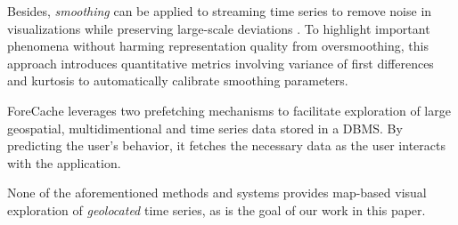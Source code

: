 Besides, {\em smoothing} can be applied to streaming time series to remove noise in visualizations while preserving large-scale deviations \cite{rong2017vldb}. To highlight important phenomena without harming representation quality from oversmoothing, this approach introduces quantitative metrics involving variance of first differences and kurtosis to automatically calibrate smoothing parameters.

ForeCache \cite{battle2016sigmod} leverages two prefetching mechanisms to facilitate exploration of large geospatial, multidimentional and time series data stored in a DBMS. By predicting the user's behavior, it fetches the necessary data as the user interacts with the application.

None of the aforementioned methods and systems provides map-based visual exploration of {\em geolocated} time series, as is the goal of our work in this paper.
\vspace{-7pt}

\begin{comment}
\snote{{\bf CHECK:} The following are not related to time series.}

IncVisage \cite{rahman2017vldb} is an incremental visualization tool for obtaining trendlines and heatmaps over large datasets. Trading error against latency, it employs online sampling schemes in order to quickly provide a visualization encompassing salient features with error guarantees. Afterwards, at an extra overhead, this initial approximation can get incrementally improved and finally even become exact over the entire data.

ZQL is a visual exploration algebra and query language introduced in \cite{siddiqui2016vldb}, which is able to express visual patterns through an interactive GUI. When searching for such patterns (e.g., representatives or outliers) in large data collections, a graph-based query optimizer operates as a wrapper over any relational DBMS used as a backend repository.

FlashView \cite{pang2017vldb} is a visual data explorer that can directly query raw data files and estimate a series of aggregates in real-time. Those correlated estimates can be depicted into charts through a user interface.

Foresight \cite{demiralp2017vldb} is a platform that facilitates discovery of visual insights (e.g., dispersion, skewness, outliers, linear correlation) from large high-dimensional datasets. Instead of directly exploring data dimensions and visual encodings, this approach handles those insights as first-class citizens in its model and offers query tools and metrics for their effective discovery after a necessary preprocessing step that provides approximate descriptors of the data (sketches, samples).

\end{comment}

